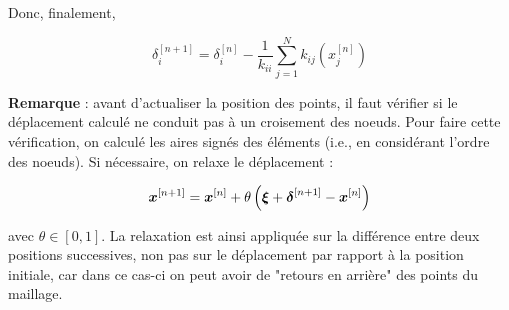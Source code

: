 \indent Donc, finalement,

\begin{equation*}
	\delta_i^{[n+1]} =  \delta_i^{[n]} -\frac{1}{k_{ii}} \sum_{j=1}^N k_{ij}(x_j^{[n]})
\end{equation*}

\indent \textbf{Remarque} : avant d'actualiser la position des points, il faut vérifier si le déplacement calculé ne conduit pas à un croisement des noeuds. Pour faire cette vérification, on calculé les aires signés des éléments (i.e., en considérant l'ordre des noeuds). Si nécessaire, on relaxe le déplacement : 


\begin{equation*}
	\boldsymbol{x}^{[n+1]} = \boldsymbol{x}^{[n]} + \theta \left( \boldsymbol{\xi} + \boldsymbol{\delta}^{[n+1]} - \boldsymbol{x}^{[n]} \right)
\end{equation*} 

\noindent avec \(\theta \in [0,1]\). La relaxation est ainsi appliquée sur la différence entre deux positions successives, non pas sur le déplacement par rapport à la position initiale, car dans ce cas-ci on peut avoir de "retours en arrière" des points du maillage.